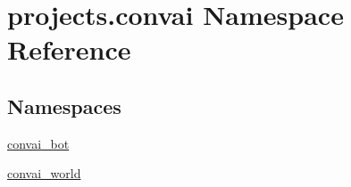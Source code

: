 \hypertarget{namespaceprojects_1_1convai}{}\section{projects.\+convai Namespace Reference}
\label{namespaceprojects_1_1convai}
\subsection*{Namespaces}
\begin{DoxyCompactItemize}
\item 
 \hyperlink{namespaceprojects_1_1convai_1_1convai__bot}{convai\+\_\+bot}
\item 
 \hyperlink{namespaceprojects_1_1convai_1_1convai__world}{convai\+\_\+world}
\end{DoxyCompactItemize}
